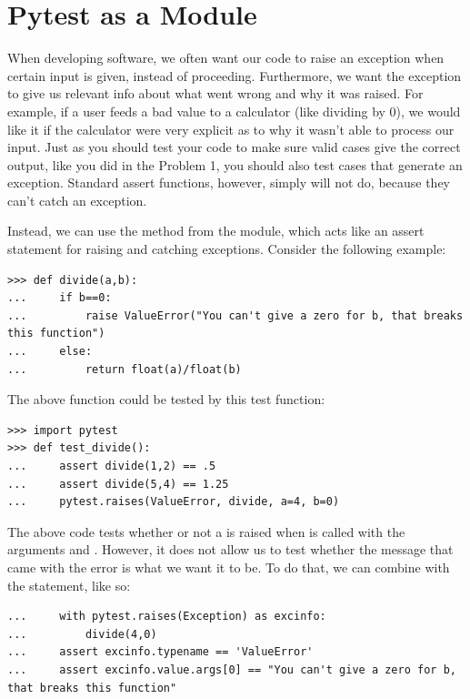 \section*{Pytest as a Module} %

When developing software, we often want our code to raise an exception when certain input is given, instead of proceeding.  Furthermore, we want the exception to give us relevant info about what went wrong and why it was raised.
For example, if a user feeds a bad value to a calculator (like dividing by 0), we would like it if the calculator were very explicit as to why it wasn't able to process our input.
Just as you should test your code to make sure valid cases give the correct output, like you did in the Problem 1, you should also test cases that generate an exception.  Standard assert functions, however, simply will not do, because they can't catch an exception.

Instead, we can use the  method from the  module, which acts like an assert statement for raising and catching exceptions.
Consider the following example:

\begin{lstlisting}
>>> def divide(a,b):
...     if b==0:
...         raise ValueError("You can't give a zero for b, that breaks this function")
...     else:
...         return float(a)/float(b)
\end{lstlisting}

The above function could be tested by this test function:

\begin{lstlisting}
>>> import pytest
>>> def test_divide():
...     assert divide(1,2) == .5
...     assert divide(5,4) == 1.25
...     pytest.raises(ValueError, divide, a=4, b=0)

\end{lstlisting}

The above code tests whether or not a  is raised when  is called with the arguments  and .  However, it does not allow us to test whether the message that came with the error is what we want it to be.  To do that, we can combine  with the  statement, like so:

\begin{lstlisting}
...     with pytest.raises(Exception) as excinfo:
...         divide(4,0)
...     assert excinfo.typename == 'ValueError'
...     assert excinfo.value.args[0] == "You can't give a zero for b, that breaks this function"
\end{lstlisting}


